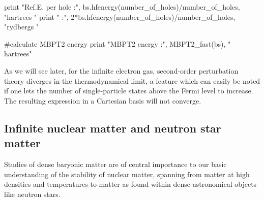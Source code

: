 \documentclass[%
oneside,                 %
final,                   %
10pt]{article}
\newenvironment{doconceexercise}{}{}
\begin{document}
\begin{doconceexercise}
print "Ref.E. per hole :", bs.hfenergy(number_of_holes)/number_of_holes, "hartrees "
print "                :", 2*bs.hfenergy(number_of_holes)/number_of_holes, "rydbergs "



#calculate MBPT2 energy
print "MBPT2 energy    :", MBPT2_fast(bs), " hartrees"
\epycod

As we will see later, for the infinite electron gas, second-order perturbation theory diverges in the thermodynamical limit, a feature which can easily be noted if one lets the number of single-particle states above the Fermi level to increase. The resulting expression in a Cartesian basis will not converge.




\end{doconceexercise}


\subsection{Infinite nuclear matter and neutron star matter}

Studies of dense baryonic matter are of central importance to our basic understanding 
of the stability of nuclear matter, spanning from matter at high densities and temperatures
to matter as found within dense astronomical objects  like neutron stars. 
\end{document}
